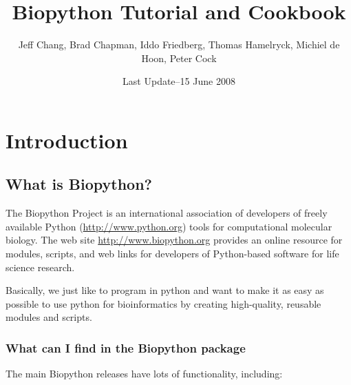 \documentclass{report}
\begin{document}
\title{Biopython Tutorial and Cookbook}
\author{Jeff Chang, Brad Chapman, Iddo Friedberg, Thomas Hamelryck, Michiel de Hoon, Peter Cock}
\date{Last Update--15 June 2008}

\maketitle
\tableofcontents

\chapter{Introduction}
\label{chapter:introduction}

\section{What is Biopython?}

The Biopython Project is an international association of developers of freely available Python (\url{http://www.python.org}) tools for computational molecular biology. The web site \url{http://www.biopython.org} provides an online resource for modules, scripts, and web links for developers of Python-based software for life science research.

Basically, we just like to program in python and want to make it as easy as possible to use python for bioinformatics by creating high-quality, reusable modules and scripts.

\subsection{What can I find in the Biopython package}

The main Biopython releases have lots of functionality, including:
\end{document}
